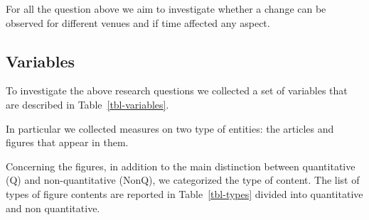 \documentclass[
  10pt,
  conference,
]{IEEEtran}%
\begin{document}
For all the question above we aim to investigate whether a change can be
observed for different venues and if time affected any aspect.

\subsection{Variables}\label{sec-variables}

To investigate the above research questions we collected a set of
variables that are described in Table~\ref{tbl-variables}.

In particular we collected measures on two type of entities: the
articles and figures that appear in them.

\begin{table}

\caption{\label{tbl-variables}Variables}


\end{table}%

Concerning the figures, in addition to the main distinction between
quantitative (Q) and non-quantitative (NonQ), we categorized the type of
content. The list of types of figure contents are reported in
Table~\ref{tbl-types} divided into quantitative and non quantitative.
\end{document}
